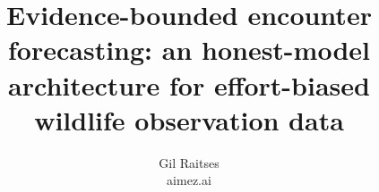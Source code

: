 \documentclass[10pt,twocolumn]{article}
\title{Evidence-bounded encounter forecasting: an honest-model architecture
       for effort-biased wildlife observation data}
\author{Gil Raitses \\ \small aimez.ai}
\date{}
\begin{document}
\maketitle

\fontsize{8.45}{9.25}\selectfont



\newcommand{\eqintensity}{%
  \begin{equation}
  \label{eq:intensity}
  \log \lambda(x,t) = b_0 + \sum_{k} \beta_k \, \phi_k(t) + \log E(x,t)
  \end{equation}
}
\newcommand{\eqnulltest}{%
  \begin{equation}
  \label{eq:nulltest}
  p_{\text{null}} = P\!\bigl(T(\text{shuffled}) \geq T(\text{observed})\bigr)
  \end{equation}
}
\newcommand{\eqtrescaling}{%
  \begin{equation}
  \label{eq:trescaling}
  \tau_i = \Lambda(t_i) - \Lambda(t_{i-1}), \quad \tau_i \overset{\mathrm{H}_0}{\sim} \mathrm{Exp}(1)
  \end{equation}
}
\newcommand{\eqeffconf}{%
  \begin{equation}
  \label{eq:effconf}
  c_{\text{eff}} = c_{\text{raw}} \cdot \prod_{k} g_k, \quad g_k \in \{0, 1\}
  \end{equation}
}
\newcommand{\eqdevskill}{%
  \begin{equation}
  \label{eq:devskill}
  S_D = 1 - \frac{D_{\text{model}}}{D_{\text{null}}}
  \end{equation}
}
\newcommand{\eqpit}{%
  \begin{equation}
  \label{eq:pit}
  u_i = F_{\text{model}}(y_i), \quad u_i \overset{\mathrm{H}_0}{\sim} \mathrm{Uniform}(0,1)
  \end{equation}
}
\newcommand{\equncited}{%
  \begin{equation}
  \label{eq:uncited}
  R_{\text{uncited}} = \frac{\bigl|\{ s \in S_{\mathrm{sci}} : \nexists\; \text{cited\_name} \in s \}\bigr|}{|S_{\mathrm{sci}}|}
  \end{equation}
}
\newcommand{\eqcmxgraph}{%
  \begin{equation}
  \label{eq:cmxgraph}
  G = (V, E), \quad V = \{\text{metric}, C, M, X, D, R\}
  \end{equation}
}










\clearpage
\nocite{*}
\printbibliography[title={References}]

\end{document}
